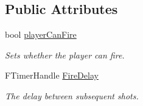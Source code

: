 \subsection*{Public Attributes}
\begin{DoxyCompactItemize}
\item 
\mbox{\label{class_a_main_character_a03aaa75e5621aece381717731ade0529}} 
bool \mbox{\hyperlink{class_a_main_character_a03aaa75e5621aece381717731ade0529}{player\+Can\+Fire}}
\begin{DoxyCompactList}\small\item\em Sets whether the player can fire. \end{DoxyCompactList}\item 
\mbox{\label{class_a_main_character_aeb723bc23c75b06e706ae1e973d6e14e}} 
F\+Timer\+Handle \mbox{\hyperlink{class_a_main_character_aeb723bc23c75b06e706ae1e973d6e14e}{Fire\+Delay}}
\begin{DoxyCompactList}\small\item\em The delay between subsequent shots. \end{DoxyCompactList}\end{DoxyCompactItemize}
